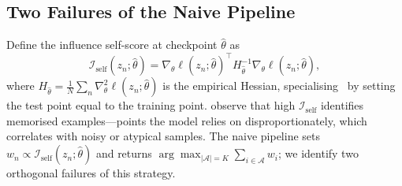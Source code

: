 \subsection{Two Failures of the Naive Pipeline} \label{ch5:sec:03-theory-failures}

\begin{foldable} %
    Define the influence self-score at checkpoint $\hat{\theta}$ as
    \begin{equation}
        \mathcal{I}_\text{self}(z_n; \hat{\theta}) = \nabla_\theta \ell(z_n; \hat{\theta})^\top H_{\hat{\theta}}^{-1} \nabla_\theta \ell(z_n; \hat{\theta}),
        \label{ch5:eq:influence-self}
    \end{equation}
    where $H_{\hat{\theta}} = \frac{1}{N}\sum_n \nabla^2_\theta \ell(z_n; \hat{\theta})$ is the empirical Hessian, specialising~\cite{koh2017understanding} by setting the test point equal to the training point.
    \cite{koh2017understanding} observe that high $\mathcal{I}_\text{self}$ identifies memorised examples---points the model relies on disproportionately, which correlates with noisy or atypical samples.
    The naive pipeline sets $w_n \propto \mathcal{I}_\text{self}(z_n; \hat{\theta})$ and returns $\arg\max_{|\mathcal{A}|=K} \sum_{i \in \mathcal{A}} w_i$; we identify two orthogonal failures of this strategy.
\end{foldable}

